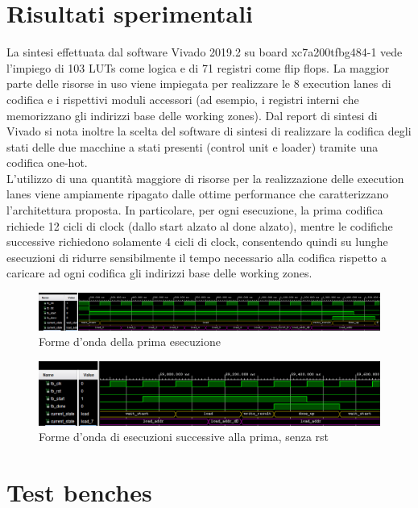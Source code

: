 \documentclass[10pt,english, openany]{book}
\begin{document}
\chapter{Risultati sperimentali}

La sintesi effettuata dal software Vivado 2019.2 su board xc7a200tfbg484-1 vede l’impiego di 103 LUTs come logica e di 71 registri come flip flops. La maggior parte delle risorse in uso viene impiegata per realizzare le 8 execution lanes di codifica e i rispettivi moduli accessori (ad esempio, i registri interni che memorizzano gli indirizzi base delle working zones). Dal report di sintesi di Vivado si nota inoltre la scelta del software di sintesi di realizzare la codifica degli stati delle due macchine a stati presenti (control unit e loader) tramite una codifica one-hot.\\
L’utilizzo di una quantità maggiore di risorse per la realizzazione delle execution lanes viene ampiamente ripagato dalle ottime performance che caratterizzano l’architettura proposta. In particolare, per ogni esecuzione, la prima codifica richiede 12 cicli di clock (dallo start alzato al done alzato), mentre le codifiche successive richiedono solamente 4 cicli di clock, consentendo quindi su lunghe esecuzioni di ridurre sensibilmente il tempo necessario alla codifica rispetto a caricare ad ogni codifica gli indirizzi base delle working zones.\\
\begin{figure}[h!]
    \centering
    \includegraphics[scale=0.38]{waveforms_first_encode.PNG}
    \caption{Forme d'onda della prima esecuzione}
    \label{fig:first_encode}
\end{figure}{}
\begin{figure}[h!]
    \centering
    \includegraphics[scale=0.4]{waveforms_consecutive_encode.PNG}
    \caption{Forme d'onda di esecuzioni successive alla prima, senza rst}
    \label{fig:consecutive_encode}
\end{figure}{}

\chapter{Test benches}
\end{document}

